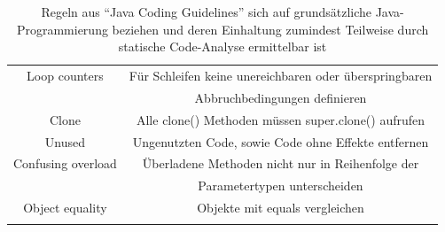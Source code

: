 \documentclass[da,ngerman]{stthesis}
\begin{document}
\begin{center}
\begin{longtabu}{|c|c|}
						Loop counters & Für Schleifen keine unereichbaren oder überspringbaren \\ & Abbruchbedingungen definieren \\
						\hline
						Clone & Alle clone() Methoden müssen super.clone() aufrufen \\
						\hline
						Unused & Ungenutzten Code, sowie Code ohne Effekte entfernen \\
						\hline
						Confusing overload & Überladene Methoden nicht nur in Reihenfolge der \\ & Parametertypen unterscheiden \\
						\hline
						Object equality & Objekte mit equals vergleichen \\
  						\hline
  						\caption{Regeln aus "`Java Coding Guidelines"' sich auf grundsätzliche Java-Programmierung beziehen und deren Einhaltung zumindest Teilweise durch statische Code-Analyse ermittelbar ist \cite{JavaCodingGuidelines}}
						\label{guidelinesrules}
  					\end{longtabu}   
  				\end{center}
\end{document}
